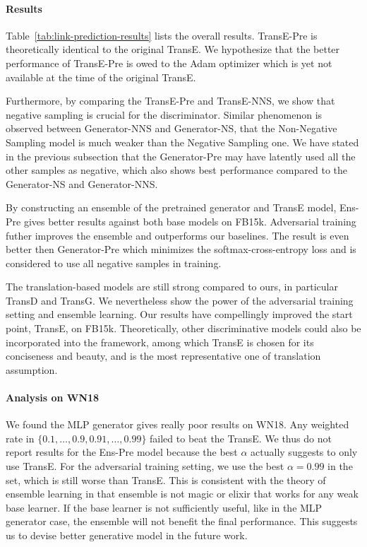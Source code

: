 \documentclass[twocolumn,a4paper,preprint,10pt,3p]{elsarticle}
\begin{document}
\paragraph{Results} Table~\ref{tab:link-prediction-results} lists the overall results. TransE-Pre is theoretically identical to the original TransE. We hypothesize that the better performance of TransE-Pre is owed to the Adam optimizer which is yet not available at the time of the original TransE.

Furthermore, by comparing the TransE-Pre and TransE-NNS, we show that negative sampling is crucial for the discriminator. Similar phenomenon is observed between Generator-NNS and Generator-NS, that the Non-Negative Sampling model is much weaker than the Negative Sampling one. We have stated in the previous subsection that the Generator-Pre may have latently used all the other samples as negative, which also shows best performance compared to the Generator-NS and {Generator-NNS}.

By constructing an ensemble of the pretrained generator and TransE model, Ens-Pre gives better results against both base models on FB15k. Adversarial training futher improves the ensemble and outperforms our baselines. The result is even better then Generator-Pre which minimizes the softmax-cross-entropy loss and is considered to use all negative samples in training.

The translation-based models are still strong compared to ours, in particular TransD and TransG. We nevertheless show the power of the adversarial training setting and ensemble learning. Our results have compellingly improved the start point, TransE, on FB15k. Theoretically, other discriminative models could also be incorporated into the framework, among which TransE is chosen for its conciseness and beauty, and is the most representative one of translation assumption.

\paragraph{Analysis on WN18\label{subsec:WN18-notes}} We found the MLP generator gives really poor results on WN18. Any weighted rate in $\{ 0.1, \dots, 0.9, 0.91, \dots, 0.99 \}$ failed to beat the TransE. We thus do not report results for the Ens-Pre model because the best $\alpha$ actually suggests to only use TransE. For the adversarial training setting, we use the best $\alpha=0.99$ in the set, which is still worse than TransE. This is consistent with the theory of ensemble learning in that ensemble is not magic or elixir that works for any weak base learner. If the base learner is not sufficiently useful, like in the MLP generator case, the ensemble will not benefit the final performance. This suggests us to devise better generative model in the future work.
\end{document}
